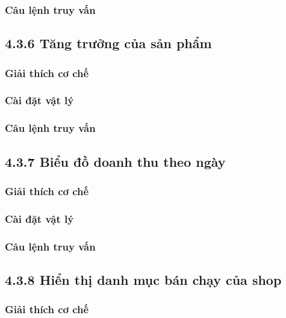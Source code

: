 \subsubsection{Câu lệnh truy vấn}

\subsection{4.3.6 Tăng trưởng của sản phẩm}

\subsubsection{Giải thích cơ chế}

\subsubsection{Cài đặt vật lý}

\subsubsection{Câu lệnh truy vấn}

\subsection{4.3.7 Biểu đồ doanh thu theo ngày}

\subsubsection{Giải thích cơ chế}

\subsubsection{Cài đặt vật lý}

\subsubsection{Câu lệnh truy vấn}

\subsection{4.3.8 Hiển thị danh mục bán chạy của shop}

\subsubsection{Giải thích cơ chế}

